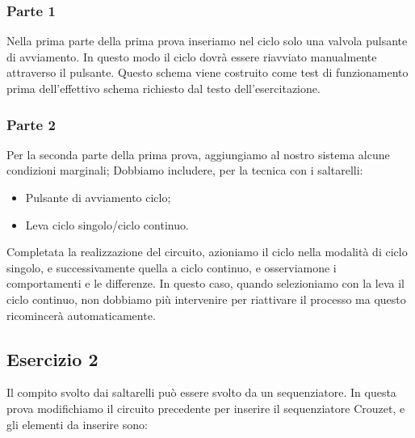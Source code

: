 \documentclass[a4paper]{article}
\begin{document}
\subsubsection{Parte 1}
Nella prima parte della prima prova inseriamo nel ciclo solo una valvola pulsante di avviamento. In questo modo il ciclo dovrà essere riavviato manualmente attraverso il pulsante. Questo schema viene costruito come test di funzionamento prima dell’effettivo schema richiesto dal testo dell’esercitazione.
\subsubsection{Parte 2}
Per la seconda parte della prima prova, aggiungiamo al nostro sistema alcune condizioni marginali;
Dobbiamo includere, per la tecnica con i saltarelli:
\begin{itemize}
\item Pulsante di avviamento ciclo;
\item Leva ciclo singolo/ciclo continuo.
\end{itemize}

Completata la realizzazione del circuito, azioniamo il ciclo nella modalità di ciclo singolo, e successivamente quella a ciclo continuo, e osserviamone i comportamenti e le differenze. In questo caso, quando selezioniamo con la leva il ciclo continuo, non dobbiamo più intervenire per riattivare il processo ma questo ricomincerà automaticamente.

\subsection{Esercizio 2}
Il compito svolto dai saltarelli può essere svolto da un sequenziatore. In questa prova modifichiamo il circuito precedente per inserire il sequenziatore Crouzet, e gli elementi da inserire sono:
\end{document}
